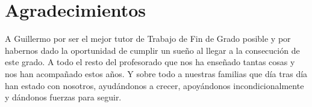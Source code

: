 
\chapter*{Agradecimientos}

A Guillermo por ser el mejor tutor de Trabajo de Fin de Grado posible y por habernos dado la oportunidad de cumplir un sueño al llegar a la consecución de este grado.
A todo el resto del profesorado que nos ha enseñado tantas cosas y nos han acompañado estos años.
Y sobre todo a nuestras familias que día tras día han estado con nosotros, ayudándonos a crecer, apoyándonos incondicionalmente y dándonos fuerzas para seguir.










